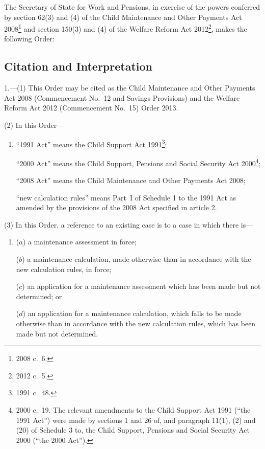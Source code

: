 \documentclass[12pt,a4paper]{article}
\title{\regstitle}
\author{S.I.\ 2013 No.\ 2947 (C.~121)}
\date{Made
19th November 2013
}
\begin{document}
\maketitle

\enlargethispage{\baselineskip}

\noindent
The Secretary of State for Work and Pensions, in exercise of the powers conferred by section 62(3) and (4) of the Child Maintenance and Other Payments Act 2008\footnote{2008 c.~6.} and section 150(3) and (4) of the Welfare Reform Act 2012\footnote{2012 c.~5.}, makes the following Order: 

{\sloppy

\tableofcontents

}

\bigskip

\setcounter{secnumdepth}{-2}

\subsection[1. Citation and Interpretation]{Citation and Interpretation}

1.---(1)  This Order may be cited as the Child Maintenance and Other Payments Act 2008 (Commencement No.~12 and Savings Provisions) and the Welfare Reform Act 2012 (Commencement No.~15) Order 2013.

(2) In this Order—
\begin{enumerate}\item[]
“1991 Act” means the Child Support Act 1991\footnote{1991 c.~48.};

“2000 Act” means the Child Support, Pensions and Social Security Act 2000\footnote{2000 c.~19. The relevant amendments to the Child Support Act 1991 (“the 1991 Act”) were made by sections 1 and 26 of, and paragraph 11(1), (2) and (20) of Schedule 3 to, the Child Support, Pensions and Social Security Act 2000 (“the 2000 Act”).};

“2008 Act” means the Child Maintenance and Other Payments Act 2008;

“new calculation rules” means Part~I of Schedule 1 to the 1991 Act as amended by the provisions of the 2008 Act specified in article 2.
\end{enumerate}

(3) In this Order, a reference to an existing case is to a case in which there is—
\begin{enumerate}\item[]
($a$) a maintenance assessment in force;

($b$) a maintenance calculation, made otherwise than in accordance with the new calculation rules, in force;

($c$) an application for a maintenance assessment which has been made but not determined; or

($d$) an application for a maintenance calculation, which falls to be made otherwise than in accordance with the new calculation rules, which has been made but not determined.
\end{enumerate}
\end{document}
